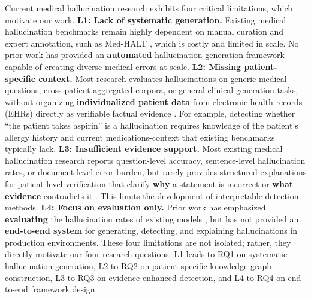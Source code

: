 \documentclass[11pt]{article}
\begin{document}
Current medical hallucination research exhibits four critical limitations, which motivate our work. \textbf{L1: Lack of systematic generation.} Existing medical hallucination benchmarks remain highly dependent on manual curation and expert annotation, such as Med-HALT \citep{pal2023medHalt}, which is costly and limited in scale. No prior work has provided an \textbf{automated} hallucination generation framework capable of creating diverse medical errors at scale. \textbf{L2: Missing patient-specific context.} Most research evaluates hallucinations on generic medical questions, cross-patient aggregated corpora, or general clinical generation tasks, without organizing \textbf{individualized patient data} from electronic health records (EHRs) directly as verifiable factual evidence \citep{rotmensch2017healthKnowledgeGraph,finlayson2014graphMedicine}. For example, detecting whether ``the patient takes aspirin'' is a hallucination requires knowledge of the patient's allergy history and current medications-context that existing benchmarks typically lack. \textbf{L3: Insufficient evidence support.} Most existing medical hallucination research reports question-level accuracy, sentence-level hallucination rates, or document-level error burden, but rarely provides structured explanations for patient-level verification that clarify \textbf{why} a statement is incorrect or \textbf{what evidence} contradicts it \citep{tonekaboni2019cliniciansWant,asgari2025clinicalSafetySummarisation,williams2025dischargeSummaries}. This limits the development of interpretable detection methods. \textbf{L4: Focus on evaluation only.} Prior work has emphasized \textbf{evaluating} the hallucination rates of existing models \citep{pal2023medHalt}, but has not provided an \textbf{end-to-end system} for generating, detecting, and explaining hallucinations in production environments. These four limitations are not isolated; rather, they directly motivate our four research questions: L1 leads to RQ1 on systematic hallucination generation, L2 to RQ2 on patient-specific knowledge graph construction, L3 to RQ3 on evidence-enhanced detection, and L4 to RQ4 on end-to-end framework design.
\end{document}
